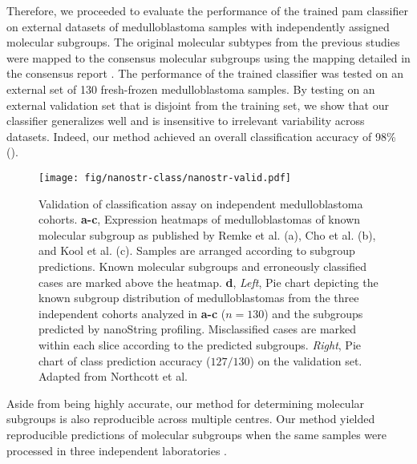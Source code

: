 Therefore, we proceeded to evaluate the performance of the trained \gls{pam} classifier on external datasets of medulloblastoma samples with independently assigned molecular subgroups. The original molecular subtypes from the previous studies were mapped to the consensus molecular subgroups using the mapping detailed in the consensus report . The performance of the trained classifier was tested on an external set of 130 fresh-frozen medulloblastoma samples. By testing on an external validation set that is disjoint from the training set, we show that our classifier generalizes well and is insensitive to irrelevant variability across datasets. Indeed, our method achieved an overall classification accuracy of 98\% ().

\begin{figure}[hb]
	\begin{center}
		\texttt{[image: fig/nanostr-class/nanostr-valid.pdf]}
	\end{center}
	\caption[Validation of classification assay on independent medulloblastoma cohorts]
	{
	Validation of classification assay on independent medulloblastoma cohorts.
	\textbf{a-c}, Expression heatmaps of medulloblastomas of known molecular subgroup as published by Remke et al. (a), Cho et al. (b), and Kool et al. (c). Samples are arranged according to subgroup predictions. Known molecular subgroups and erroneously classified cases are marked above the heatmap.
	\textbf{d}, \emph{Left}, Pie chart depicting the known subgroup distribution of medulloblastomas from the three independent cohorts analyzed in \textbf{a-c} ($n = 130$) and the subgroups predicted by nanoString profiling. Misclassified cases are marked within each slice according to the predicted subgroups. \emph{Right}, Pie chart of class prediction accuracy ($127/130$) on the validation set. Adapted from Northcott et al.
	}
	\label{fig:nanostr-valid}
\end{figure}

Aside from being highly accurate, our method for determining molecular subgroups is also reproducible across multiple centres. Our method yielded reproducible predictions of molecular subgroups when the same samples were processed in three independent laboratories .

